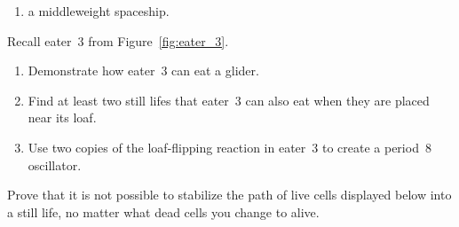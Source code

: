 \begin{multicols}{2}
\begin{problem}
\begin{enumerate}[label=\bf\color{ocre}(\alph*)]
			\item a middleweight spaceship.
		\end{enumerate}
	\end{problem}
	
	
	\mfilbreak
	
	
	\begin{problem}\label{exer:eater_3}
		Recall eater~3 from Figure~\ref{fig:eater_3}.\smallskip
		
		\begin{enumerate}[label=\bf\color{ocre}(\alph*)]
			\item {} Demonstrate how eater~3 can eat a glider.
			
			\item {} Find at least two still lifes that eater~3 can also eat when they are placed near its loaf.
			
			\item {} Use two copies of the loaf-flipping reaction in eater~3 to create a period~$8$ oscillator.
		\end{enumerate}
	\end{problem}
	
	
	\mfilbreak
	
	
	\begin{problem}\label{exer:still_life_impossible} 
		Prove that it is not possible to stabilize the path of live cells displayed below into a still life, no matter what dead cells you change to alive.
		

\end{problem}
\end{multicols}
